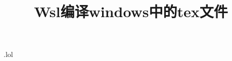 \RequirePackage{filecontents}
\begin{filecontents*}{\jobname.lol}
\listfiles
\end{filecontents*}


\documentclass{article}
\usepackage{ctex}
\usepackage{listings}



\title{Wsl编译windows中的tex文件}

\maketitle

\lstset{basicstyle=\ttfamily}



\section{测试}

使用 wsl 中的latex 编译windows 中的tex文件测试

\section{结论}
可以编译，但是由于跨了文件系统，所以编译速度很慢。
没办法，I/O 太慢了。


